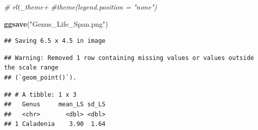 \documentclass[
]{book}
\newenvironment{Shaded}{\begin{snugshade}}{\end{snugshade}}
\newcommand{\AttributeTok}[1]{\textcolor[rgb]{0.13,0.29,0.53}{#1}}
\newcommand{\CommentTok}[1]{\textcolor[rgb]{0.56,0.35,0.01}{\textit{#1}}}
\newcommand{\ConstantTok}[1]{\textcolor[rgb]{0.56,0.35,0.01}{#1}}
\newcommand{\FunctionTok}[1]{\textcolor[rgb]{0.13,0.29,0.53}{\textbf{#1}}}
\newcommand{\NormalTok}[1]{#1}
\newcommand{\SpecialCharTok}[1]{\textcolor[rgb]{0.81,0.36,0.00}{\textbf{#1}}}
\newcommand{\StringTok}[1]{\textcolor[rgb]{0.31,0.60,0.02}{#1}}
\theoremstyle{definition}
\theoremstyle{definition}
\theoremstyle{definition}
\theoremstyle{definition}
\theoremstyle{remark}
\begin{document}
\begin{Shaded}
\begin{Highlighting}[]
\CommentTok{\#  rlt\_theme+}
  \CommentTok{\#theme(legend.position = "none")}

\FunctionTok{ggsave}\NormalTok{(}\StringTok{"Genus\_Life\_Span.png"}\NormalTok{)}
\end{Highlighting}
\end{Shaded}

\begin{verbatim}
## Saving 6.5 x 4.5 in image
\end{verbatim}

\begin{verbatim}
## Warning: Removed 1 row containing missing values or values outside the scale range
## (`geom_point()`).
\end{verbatim}

\begin{Shaded}
\end{Shaded}

\begin{verbatim}
## # A tibble: 1 x 3
##   Genus     mean_LS sd_LS
##   <chr>       <dbl> <dbl>
## 1 Caladenia    3.90  1.64
\end{verbatim}
\end{document}
